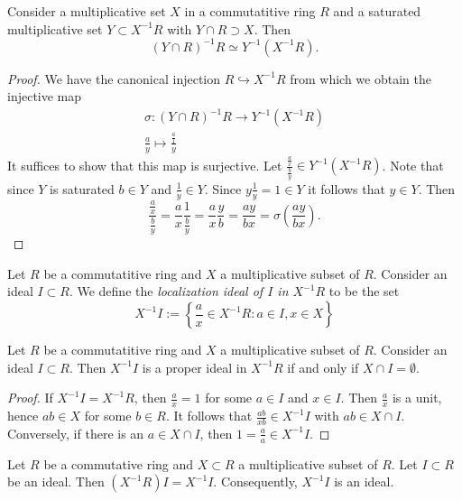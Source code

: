     \begin{lemma}\label{CanonicalOfLocalizations}
        Consider a multiplicative set $X$ in a commutatitive ring $R$ and a saturated multiplicative set $Y\subset X^{-1}R$ with $Y\cap R\supset X$. Then 
        $$
            (Y\cap R)^{-1}R \simeq Y^{-1}(X^{-1}R).
        $$
    \end{lemma}
    \begin{proof}
        We have the canonical injection $R\hookrightarrow X^{-1}R$ from which we obtain the injective map 
        \begin{gather*}
            \sigma : (Y\cap R)^{-1}R \rightarrow Y^{-1}(X^{-1}R)\\
            \frac{a}{y}\mapsto \frac{\frac{a}{1}}{y}
        \end{gather*}
        It suffices to show that this map is surjective. Let $\frac{\frac{a}{x}}{\frac{b}{y}}\in Y^{-1}(X^{-1}R)$. Note that since $Y$ is saturated $b\in Y$ and $\frac{1}{y}\in Y$. Since $y\frac{1}{y} = 1\in Y$ it follows that $y\in Y$. Then 
        $$
            \frac{\frac{a}{x}}{\frac{b}{y}} = \frac{a}{x}\frac{1}{\frac{b}{y}} = \frac{a}{x}\frac{y}{b} = \frac{ay}{bx} = \sigma\left(\frac{ay}{bx}\right).
        $$
    \end{proof}
    \begin{definition}
        Let $R$ be a commutatitive ring and $X$ a multiplicative subset of $R$. Consider an ideal $I\subset R$. We define the \textit{localization ideal of $I$ in $X^{-1}R$} to be the set 
        $$X^{-1}I:=\left\{\frac{a}{x}\in X^{-1}R: a\in I, x\in X\right\}$$
    \end{definition}
    \begin{lemma}
        Let $R$ be a commutatitive ring and $X$ a multiplicative subset of $R$. Consider an ideal $I\subset R$. Then $X^{-1}I$ is a proper ideal in $X^{-1}R$ if and only if $X\cap I=\emptyset$.
    \end{lemma}
    \begin{proof}
        If $X^{-1}I=X^{-1}R$, then $\frac{a}{x}=1$ for some $a\in I$ and $x\in I$. Then $\frac{a}{x}$ is a unit, hence $ab\in X$ for some $b\in R$. It follows that $\frac{ab}{xb}\in X^{-1}I$ with $ab\in X\cap I$. Conversely, if there is an $a\in X\cap I$, then $1=\frac{a}{a}\in X^{-1}I$.
    \end{proof}
\begin{lemma}\label{LocalizationIdealsDescribeIdealsGeneratedFromIdealsInSubring}
    Let $R$ be a commutative ring and $X\subset R$ a multiplicative subset of $R$. Let $I\subset R$ be an ideal. Then $(X^{-1}R)I = X^{-1}I$. Consequently, $X^{-1}I$ is an ideal.
\end{lemma}

